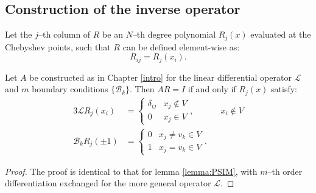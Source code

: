 \documentclass{book}
\begin{document}
\subsection{Construction of the inverse operator}

Let the $j$--th column of $R$ be an $N$--th degree polynomial $R_j(x)$ evaluated at the Chebyshev points, such that $R$ can be defined element-wise as:
\begin{equation}
R_{ij} = R_j(x_i) .
\end{equation}

\begin{lemma}
Let $A$ be constructed as in Chapter \ref{intro} for the linear differential operator $\mathcal{L}$ and $m$ boundary conditions $\{ \mathcal{B}_k \}$.
Then $AR = I$ if and only if $R_j(x)$ satisfy:
\begin{alignat}{3} \label{inverse conditions}
\mathcal{L} R_j(x_i) & = \begin{cases} \delta_{ij} & x_j \notin V \\ 0 & x_j \in V \end{cases}, && x_i \notin V \\
\mathcal{B}_k R_j(\pm 1) & = \begin{cases} 0 & x_j \neq v_k \in V \\ 1 & x_j = v_k \in V \end{cases} .
\end{alignat}
\end{lemma}

\begin{proof}
The proof is identical to that for lemma \ref{lemma:PSIM}, with $m$--th order differentiation exchanged for the more general operator $\mathcal{L}$.
\end{proof}

\end{document}
